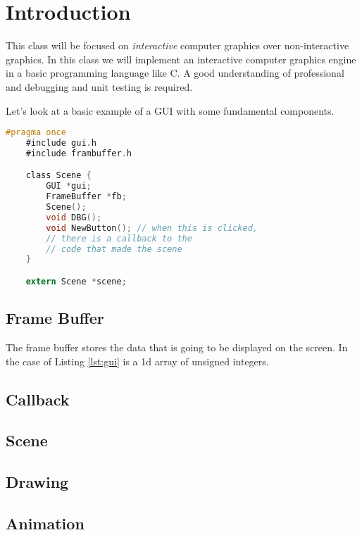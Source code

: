 \section{Introduction}

This class will be focused on \emph{interactive} computer graphics over
non-interactive graphics. In this class we will implement an interactive
computer graphics engine in a basic programming language like C. A good
understanding of professional and debugging and unit testing is required.

Let's look at a basic example of a GUI with some fundamental
components.

\begin{lstlisting}[language=C, caption=GUI, label=lst:gui]
    #pragma once 
    #include gui.h
    #include frambuffer.h

    class Scene {
        GUI *gui;
        FrameBuffer *fb;
        Scene();
        void DBG();
        void NewButton(); // when this is clicked, 
        // there is a callback to the 
        // code that made the scene
    }

    extern Scene *scene;
\end{lstlisting}

\subsection{Frame Buffer}

The frame buffer stores the data that is going to be displayed
on the screen. In the case of Listing \ref{lst:gui} is a 1d array of unsigned integers.

\subsection{Callback}


\subsection{Scene}

\subsection{Drawing}

\subsection{Animation}